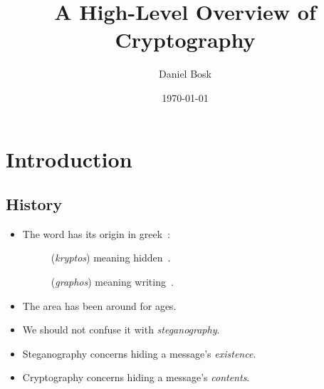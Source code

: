 \title{%
  A High-Level Overview of Cryptography
}
\author{%
  Daniel Bosk
}
\date{\today}

\maketitle

\mode*

\begin{abstract}
  
\end{abstract}





\section{Introduction}

\subsection{History}

\begin{frame}
  \begin{itemize}
    \item The word has its origin in greek~:
      \begin{description}
        \item[] (\emph{kryptos}) meaning 
          hidden~.
        \item[] (\emph{graphos}) meaning 
          writing~.
      \end{description}

      \pause{}

    \item The area has been around for ages.

      \pause{}

    \item We should not confuse it with \emph{steganography}.
    \item Steganography concerns hiding a message's \emph{existence}.
    \item Cryptography concerns hiding a message's \emph{contents}.

  \end{itemize}
\end{frame}

